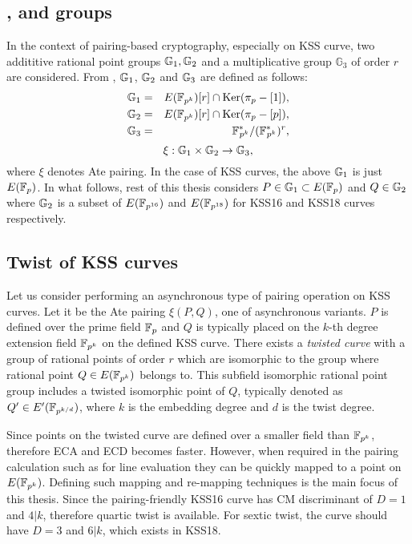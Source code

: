 \subsection{,  and  groups} In the context of pairing-based cryptography, especially on KSS curve, two addititive rational point groups ${\mathbb{G}}_{1}, {\mathbb{G}}_{2}$ and a multiplicative group $\mathbb{G}_3$ of order $r$ are considered. From \cite{PAIRING:MANS13},  ${\mathbb{G}}_{1}$, ${\mathbb{G}}_{2}$ and ${\mathbb{G}}_{3}$ are defined as follows:
\begin{eqnarray}\label{eq:g1}
{\mathbb{G}}_{1} & = &  E({\mathbb{F}}_{p^{k}}) [r] \cap \text{Ker}(\pi_p - [1]), \nonumber \\
{\mathbb{G}}_{2} & = &  E({\mathbb{F}}_{p^{k}}) [r] \cap \text{Ker}(\pi_p - [p]), \nonumber \\
{\mathbb{G}}_{3} & = & {{\mathbb{F}}^{\ast}}_{\!\!\!p^{k}}/({{\mathbb{F}}^{\ast}}_{\!\!\!p^{k}})^r, \nonumber
\end{eqnarray}
\begin{equation}
\xi : {\mathbb{G}}_{1} \times {\mathbb{G}}_{2} \rightarrow {\mathbb{G}}_{3},
\end{equation}
where $\xi$ denotes Ate pairing. In the case of KSS curves, the above ${\mathbb{G}}_{1}$ is just $E(\mathbb{F}_p)$. In what follows, rest of this thesis considers 
 $P \in {\mathbb{G}}_{1} \subset E(\mathbb{F}_p)$ and  $Q \in {\mathbb{G}}_{2}$ where  ${\mathbb{G}}_{2}$ is a subset of $E(\mathbb{F}_{p^{16}})$ and $E(\mathbb{F}_{p^{18}})$ for KSS16 and KSS18 curves respectively. 

\subsection{Twist of KSS curves}
Let us consider performing an asynchronous type of pairing operation on KSS curves.  Let it be the Ate pairing $\xi(P,Q)$, one of asynchronous variants. $P$  is defined over the prime field $\mathbb{F}_p$ and  $Q$ is typically placed on the $k$-th degree extension field $\mathbb{F}_{p^k}$ on the defined KSS curve. There exists a \textit{twisted curve} with a group of rational points of order $r$ which are isomorphic to the group where rational point $Q \in  E(\mathbb{F}_{p^k})$  belongs to. This subfield isomorphic rational point group includes a twisted isomorphic point of $Q$, typically denoted as $Q' \in E'(\mathbb{F}_{p^{k/d}})$, where $k$ is the embedding degree and $d$ is the twist degree.  

Since points on the twisted curve are defined over a smaller field than $\mathbb{F}_{p^k}$, therefore ECA and ECD becomes faster. 
However, when required in the pairing calculation such as  for line evaluation  they can be quickly mapped to a point on $E(\mathbb{F}_{p^k} )$. 
Defining such mapping and re-mapping techniques is the main focus of this  thesis. Since the pairing-friendly KSS16 \cite{EPRINT:KacSchSco07} curve has CM discriminant of $D = 1$ and $4|k$, therefore quartic twist is available. For sextic twist, the curve should have $D = 3$ and $6|k$, which exists in KSS18.

